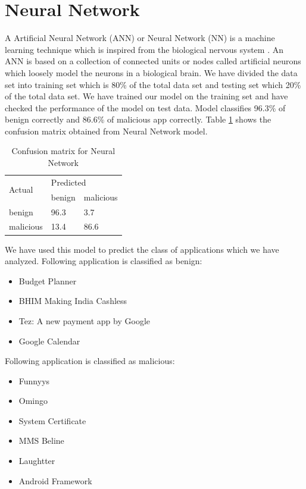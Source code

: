 \section{Neural Network}
A Artificial Neural Network (ANN) or Neural Network (NN) is a machine learning technique which is inspired from the biological nervous system \cite{wiki:xxx4}. An ANN is based on a collection of connected units or nodes called artificial neurons which loosely model the neurons in a biological brain. We have divided the data set into training set which is 80\% of the total data set and testing set which 20\% of the total data set. We have trained our model on the training set and have checked the performance of the model on test data. Model classifies 96.3\% of benign correctly and 86.6\% of malicious app correctly. Table \ref{table:tab4} shows the confusion matrix obtained from Neural Network model.
\begin{table}[!h]
\centering

\begin{tabular}{|l||l|l|}
\hline
\multirow{2}{4em}{Actual} & \multicolumn{2}{l|}{Predicted} \\ \cline{2-3} 
                  &    benign      &    malicious       \\ \hline
         benign         &      96.3     &    3.7      \\ \hline
        malicious          &     13.4      &      86.6     \\ \hline
\end{tabular}%
\caption{Confusion matrix for Neural Network}
\label{table:tab4}
\end{table}
We have used this model to predict the class of applications which we have analyzed. Following application is classified as benign:
\begin{itemize}
    \item Budget Planner
    \item BHIM Making India Cashless
    \item Tez: A new payment app by Google
    \item Google Calendar
\end{itemize}
Following application is classified as malicious:
\begin{itemize}
    \item Funnyys
    \item Omingo
    \item System Certificate
    \item MMS Beline
    \item Laughtter
    \item Android Framework
\end{itemize}
